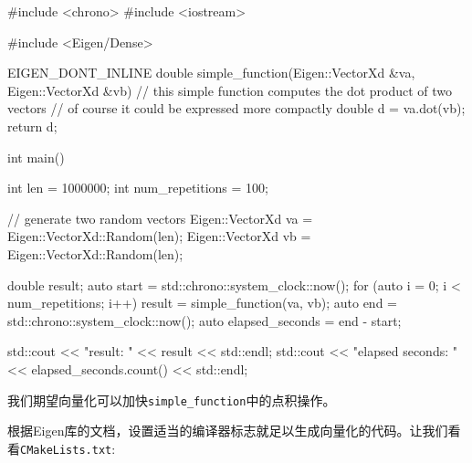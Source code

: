 \begin{codebox}[cpp]
#include <chrono>
#include <iostream>

#include <Eigen/Dense>

EIGEN_DONT_INLINE
double simple_function(Eigen::VectorXd &va, Eigen::VectorXd &vb)
{
  // this simple function computes the dot product of two vectors
  // of course it could be expressed more compactly
  double d = va.dot(vb);
  return d;
}

int main()
{
  int len = 1000000;
  int num_repetitions = 100;
  
  // generate two random vectors
  Eigen::VectorXd va = Eigen::VectorXd::Random(len);
  Eigen::VectorXd vb = Eigen::VectorXd::Random(len);
  
  double result;
  auto start = std::chrono::system_clock::now();
  for (auto i = 0; i < num_repetitions; i++)
  {
    result = simple_function(va, vb);
  }
  auto end = std::chrono::system_clock::now();
  auto elapsed_seconds = end - start;
  
  std::cout << "result: " << result << std::endl;
  std::cout << "elapsed seconds: " << elapsed_seconds.count() << std::endl;
}
\end{codebox}

我们期望向量化可以加快\texttt{simple\_function}中的点积操作。


根据Eigen库的文档，设置适当的编译器标志就足以生成向量化的代码。让我们看看\texttt{CMakeLists.txt}:

